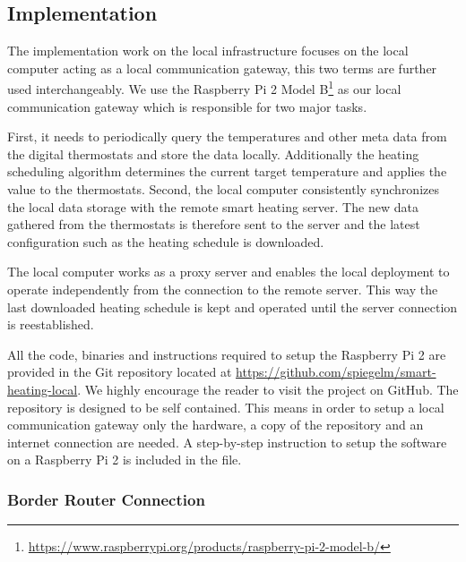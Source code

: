 \subsection{Implementation}
\label{sec:local_infrastructure_implementation}

The implementation work on the local infrastructure focuses on the local computer acting as a local communication gateway, this two terms are further used interchangeably.
We use the Raspberry Pi 2 Model B\footnote{\url{https://www.raspberrypi.org/products/raspberry-pi-2-model-b/}} as our local communication gateway which is responsible for two major tasks.

First, it needs to periodically query the temperatures and other meta data from the digital thermostats and store the data locally.
Additionally the heating scheduling algorithm determines the current target temperature and applies the value to the thermostats.
Second, the local computer consistently synchronizes the local data storage with the remote smart heating server.
The new data gathered from the thermostats is therefore sent to the server and the latest configuration such as the heating schedule is downloaded.

The local computer works as a proxy server and enables the local deployment to operate independently from the connection to the remote server.
This way the last downloaded heating schedule is kept and operated until the server connection is reestablished.


All the code, binaries and instructions required to setup the Raspberry Pi 2 are provided in the Git repository located at \url{https://github.com/spiegelm/smart-heating-local}.
We highly encourage the reader to visit the project on GitHub.
The repository is designed to be self contained.
This means in order to setup a local communication gateway only the hardware, a copy of the repository and an internet connection are needed.
A step-by-step instruction to setup the software on a Raspberry Pi 2 is included in the  file.

\subsubsection{Border Router Connection}

